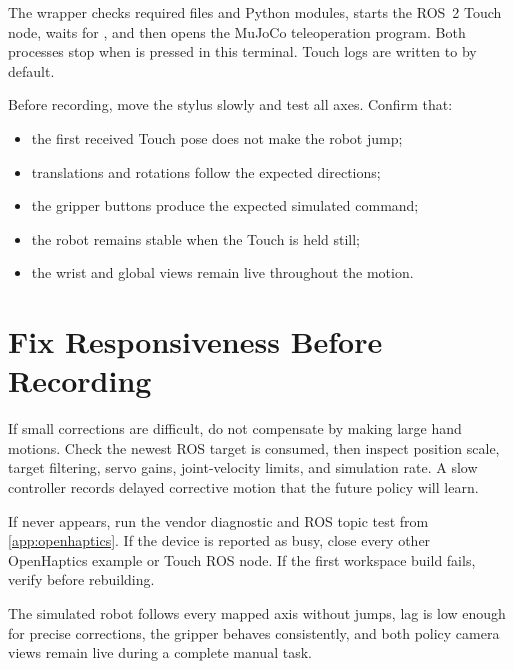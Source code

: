 The wrapper checks required files and Python modules, starts the ROS~2 Touch
node, waits for , and then opens the MuJoCo teleoperation
program. Both processes stop when  is pressed in this terminal.
Touch logs are written to
 by default.

Before recording, move the stylus slowly and test all axes. Confirm that:

\begin{itemize}
  \item the first received Touch pose does not make the robot jump;
  \item translations and rotations follow the expected directions;
  \item the gripper buttons produce the expected simulated command;
  \item the robot remains stable when the Touch is held still;
  \item the wrist and global views remain live throughout the motion.
\end{itemize}

\section{Fix Responsiveness Before Recording}

If small corrections are difficult, do not compensate by making large hand
motions. Check the newest ROS target is consumed, then inspect position scale,
target filtering, servo gains, joint-velocity limits, and simulation rate. A
slow controller records delayed corrective motion that the future policy will
learn.

\begin{warningbox}
If  never appears, run the vendor diagnostic and ROS topic
test from \cref{app:openhaptics}. If the device is reported as busy, close every
other OpenHaptics example or Touch ROS node. If the first workspace build fails,
verify  before rebuilding.
\end{warningbox}

\begin{checkpointbox}
The simulated robot follows every mapped axis without jumps, lag is low enough
for precise corrections, the gripper behaves consistently, and both policy
camera views remain live during a complete manual task.
\end{checkpointbox}
